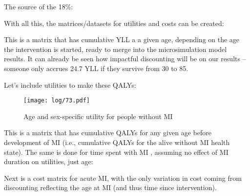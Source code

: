 \documentclass[11pt]{article}
\begin{document}
The source of the 18\%:

\color{Blue4}
\begin{stlog}\end{stlog}
\begin{stlog}\end{stlog}
\color{black}

With all this, the matrices/datasets for utilities and costs can be created:

\color{Blue4}
\begin{stlog}\end{stlog}
\begin{stlog}\end{stlog}
\color{black}

This is a matrix that has cumulative YLL a a given age, 
depending on the age the intervention is started,
ready to merge into the microsimulation model results. 
It can already be seen how impactful discounting will be
on our results -- someone only accrues 24.7 YLL
if they survive from 30 to 85. 

Let's include utilities to make these QALYs:

\color{Blue4}
\begin{figure}
    \centering
    \texttt{[image: log/73.pdf]}
    \caption{Age and sex-specific utility for people without MI}
    \label{AgeUT}
\end{figure}
\begin{stlog}\end{stlog}
\begin{stlog}\end{stlog}
\color{black}

This is a matrix that has cumulative QALYs for 
any given age before development of MI (i.e., cumulative QALYs
for the alive without MI health state). The same is done for time spent with MI
, assuming no effect of MI duration on utilities, just age:

\color{Blue4}
\begin{stlog}\end{stlog}
\begin{stlog}\end{stlog}
\color{black}

Next is a cost matrix for acute MI, with the only variation in 
cost coming from discounting reflecting the age at MI (and thus time since 
intervention). 
\end{document}
